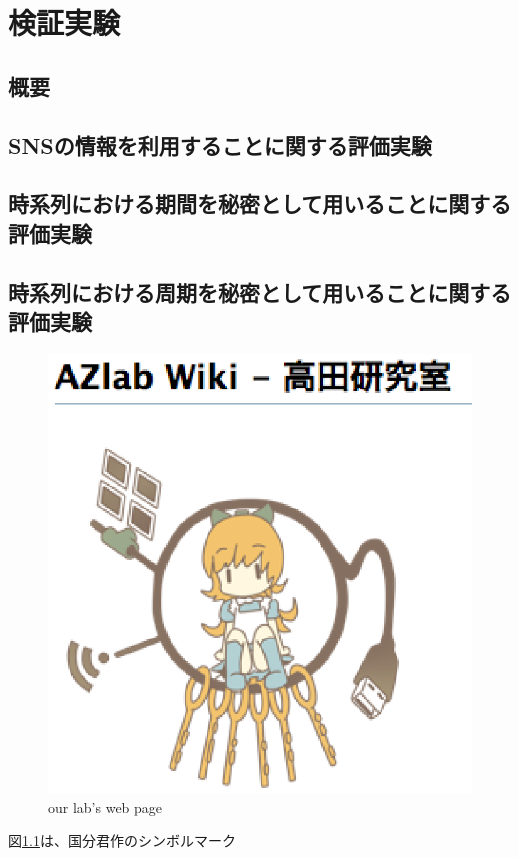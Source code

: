 \chapter{検証実験}\label{chap:experiment}

\section{概要}

\section{SNSの情報を利用することに関する評価実験}
\section{時系列における期間を秘密として用いることに関する評価実験}
\section{時系列における周期を秘密として用いることに関する評価実験}

\begin{figure}[ht]
\begin{center}
\includegraphics[scale=1.0]{img/azlabMark.eps}
\caption{our lab's web page}
\label{fig:azweb}
\end{center}
\end{figure}

図\ref{fig:azweb}は、国分君作のシンボルマーク

\newpage

